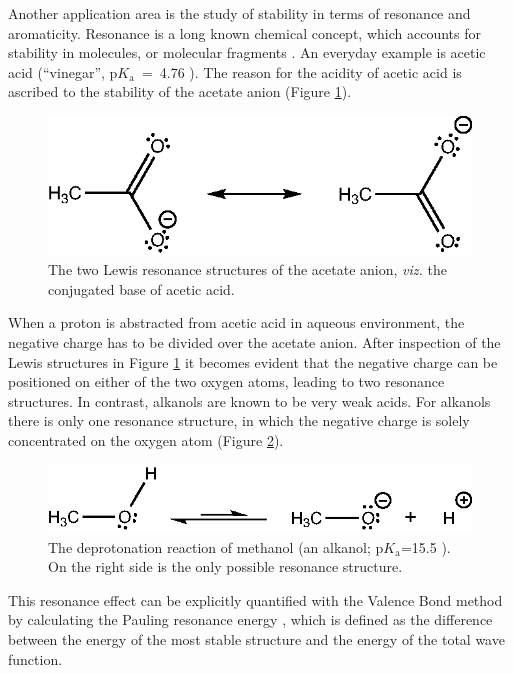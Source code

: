Another application area is the study of stability in terms of resonance and aromaticity. Resonance is a long known chemical concept, which accounts for stability in molecules, or molecular fragments \cite{whelandbook}. An everyday example is acetic acid (``vinegar'', p$K_\mathrm{a}$~=~4.76 \cite{bruice}). The reason for the acidity of acetic acid is ascribed to the stability of the acetate anion (Figure \ref{ch1.fig.acetic}).
\begin{figure}[htp]
\center
\includegraphics{introduction/figures/acetic.eps}
\caption{The two Lewis resonance structures of the acetate anion, \textit{viz.} the conjugated base of acetic acid.}
\label{ch1.fig.acetic}
\end{figure}
When a proton is abstracted from acetic acid in aqueous environment, the negative charge has to be divided over the acetate anion. After inspection of the Lewis structures in Figure \ref{ch1.fig.acetic} it becomes evident that the negative charge can be positioned on either of the two oxygen atoms, leading to two resonance structures. In contrast, alkanols are known to be very weak acids. For alkanols there is only one resonance structure, in which the negative charge is solely concentrated on the oxygen atom (Figure \ref{ch1.fig.alcohol}).
\begin{figure}[htp]
\center
\includegraphics{introduction/figures/alcohol.eps}
\caption{The deprotonation reaction of methanol (an alkanol; p$K_\mathrm{a}$=15.5 \cite{bruice}). On the right side is the only possible resonance structure.}
\label{ch1.fig.alcohol}
\end{figure}
This resonance effect can be explicitly quantified with the Valence Bond method by calculating the Pauling resonance energy \cite{paulingbook}, which is defined as the difference between the energy of the most stable structure and the energy of the total wave function. 

